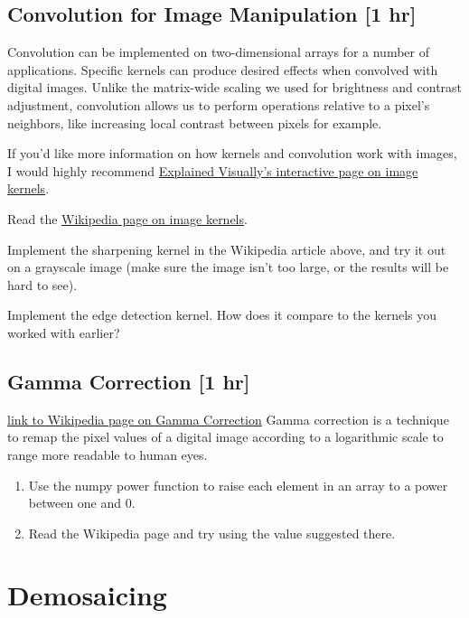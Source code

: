 \documentclass{tufte-handout}
\begin{document}
\subsection{Convolution for Image Manipulation [1 hr]}

Convolution can be implemented on two-dimensional arrays for a number of applications. Specific kernels can produce desired effects when convolved with digital images. Unlike the matrix-wide scaling we used for brightness and contrast adjustment, convolution allows us to perform operations relative to a pixel's neighbors, like increasing local contrast between pixels for example.

If you'd like more information on how kernels and convolution work with images, I would highly recommend \href{http://setosa.io/ev/image-kernels/}{Explained Visually's interactive page on image kernels}.

\bex
\item Read the \href{https://en.wikipedia.org/wiki/Kernel_(image_processing)}{Wikipedia page on image kernels}.

\item Implement the sharpening kernel in the Wikipedia article above, and try it out on a grayscale image (make sure the image isn't too large, or the results will be hard to see).
\item Implement the edge detection kernel. How does it compare to the kernels you worked with earlier?
\eex

\subsection{Gamma Correction [1 hr]}  %

\href{https://en.wikipedia.org/wiki/Gamma_correction}{link to Wikipedia page on Gamma Correction}
Gamma correction is a technique to remap the pixel values of a digital image according to a logarithmic scale to range more readable to human eyes.
\begin{enumerate}
    \item Use the numpy power function to raise each element in an array to a power between one and 0.
    \item Read the Wikipedia page and try using the value suggested there.
\end{enumerate}

\section{Demosaicing}
\end{document}
